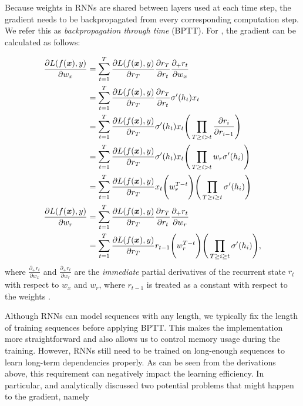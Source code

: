Because weights in RNNs are shared between layers used at  each time step, the gradient needs to be backpropagated from every corresponding computation step. We refer this as \textit{backpropagation through time} (BPTT). For \addfigure{\ref{fig:rnn_unfold}}, the gradient can be calculated as follows:

\begin{align*}
	\frac{ \partial L(f(\boldsymbol{x}), y)}{ \partial w_x } &= \sum_{t=1} ^{T} 	\frac{ \partial L(f(\boldsymbol{x}), y)}{ \partial r_T } \frac{ \partial r_T}{ \partial r_t } \frac{\partial_+r_t}{ \partial w_x} \\ 
				&= \sum_{t=1} ^{T} 	\frac{ \partial L(f(\boldsymbol{x}), y)}{ \partial r_T } \frac{ \partial r_T}{ \partial r_t } \sigma'(h_t)x_t \\
				&= \sum_{t=1} ^{T} 	\frac{ \partial L(f(\boldsymbol{x}), y)}{ \partial r_T } \sigma'(h_t)x_t \Bigg( \prod_{T \ge i > t} \frac{ \partial r_i}{ \partial r_{i-1} } \Bigg) \\
				&= \sum_{t=1} ^{T} 	\frac{ \partial L(f(\boldsymbol{x}), y)}{ \partial r_T } \sigma'(h_t)x_t \Bigg( \prod_{T \ge i > t} w_r \sigma'(h_i) \Bigg) \\
				&= \sum_{t=1} ^{T} 	\frac{ \partial L(f(\boldsymbol{x}), y)}{ \partial r_T }  x_t \Bigg( w_r^{T-t} \Bigg) \Bigg( \prod_{T \ge i \ge t} \sigma'(h_i) \Bigg) \\
\frac{\partial L(f(\boldsymbol{x}), y)}{\partial w_{r}} &=  \sum_{t=1} ^{T} 	\frac{ \partial L(f(\boldsymbol{x}), y)}{ \partial r_T } \frac{ \partial r_T}{ \partial r_t } \frac{\partial_+r_t}{ \partial w_r} \\
				&= \sum_{t=1} ^{T} 	\frac{ \partial L(f(\boldsymbol{x}), y)}{ \partial r_T }  r_{t-1} \Bigg( w_r^{T-t} \Bigg) \Bigg( \prod_{T \ge i \ge t} \sigma'(h_i) \Bigg),
\end{align*}
where $\frac{\partial_+r_t}{ \partial w_x}$ and  $\frac{\partial_+r_t}{ \partial w_r}$ are the \textit{immediate} partial derivatives  of the recurrent state $r_t$ with respect to $w_x$ and $w_r$, where $r_{t-1}$ is treated as a constant with respect to the weights \citep{Pascanudifficultytrainingrecurrent2013}.

Although RNNs can model sequences with any length, we typically fix the length of training sequences before applying BPTT. This makes the implementation more straightforward and also allows us to control memory usage during the training. However, RNNs still need to be trained on long-enough sequences to learn long-term dependencies properly. As can be seen from the derivations above, this requirement can negatively impact the learning efficiency. In particular, \citet{BengioLearninglongtermdependencies1994} and \citet{ Pascanudifficultytrainingrecurrent2013} analytically discussed two potential problems that might happen to the gradient, namely

